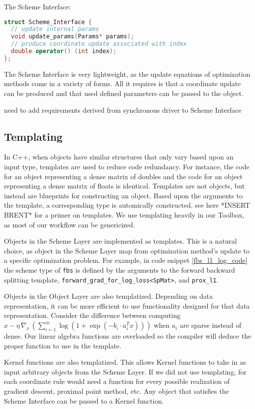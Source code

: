 The Scheme Interface:
\begin{lstlisting}[language=C++]
struct Scheme_Interface {
  // update internal params
  void update_params(Params* params);
  // produce coordinate update associated with index
  double operator() (int index);
};
\end{lstlisting}
The Scheme Interface is very lightweight, as the update equations of optimization methods come in a variety of forms. All it requires is that a coordinate update can be produced and that used defined parameters can be passed to the object.
{{\color{red} need to add requirements derived from synchronous driver to Scheme Interface}


\subsection{Templating}

In C++, when objects have similar structures that only vary based upon an input type, templates are used to reduce code redundancy. For instance, the code for an object representing a dense matrix of doubles and the code for an object representing a dense matrix of floats is identical.
Templates are not objects, but instead are blueprints for constructing an object.
Based upon the arguments to the template, a corresponding type is automically constructed. see here *INSERT BRENT* for a primer on templates.
We use templating heavily in our Toolbox, as most of our workflow can be genericized.

Objects in the Scheme Layer are implemented as templates.
This is a natural choice, as object in the Scheme Layer map from optimization method's update to a specific optimization problem.
For example, in code snippet \ref{fbs_l1_log_code} the scheme type of \texttt{fbs} is defined by the arguments to the forward backward splitting template, \texttt{forward\_grad\_for\_log\_loss<SpMat>}, and \texttt{prox\_l1}.

Objects in the Object Layer are also templatized. Depending on data representation, it can be more efficient to use functionality designed for that data representation. Consider the difference between computing $x - \eta \, \nabla_x \,(\sum_{i = 1}^m \log (1 + \exp(-b_i \cdot a_i^T x)))$ when $a_i$ are sparse instead of dense.
Our linear algebra functions are overloaded so the compiler will deduce the proper function to use in the template.

Kernel functions are also templatized. This allows Kernel functions to take in as input arbitrary objects from the Scheme Layer. If we did not use templating, for each coordinate rule would need a function for every possible realization of gradient descent, proximal point method, etc.  Any object that satisfies the Scheme Interface can be passed to a Kernel function.

}
